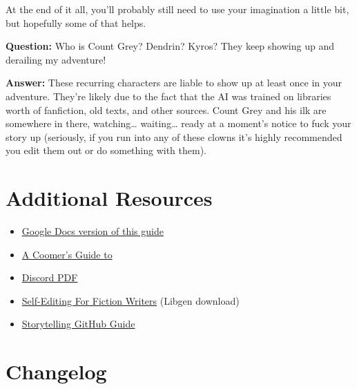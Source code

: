 \documentclass[Avsfag-main.tex]{subfiles}
\begin{document}
At the end of it all, you'll probably still need to use your imagination
a little bit, but hopefully some of that helps.\smallskip

\textbf{Question:} Who is Count Grey? Dendrin? Kyros? They keep showing
up and derailing my adventure!

\textbf{Answer:} These recurring characters are liable to show up at
least once in your adventure. They're likely due to the fact that the AI
was trained on libraries worth of fanfiction, old texts, and other
sources. Count Grey and his ilk are somewhere in there, watching…
waiting… ready at a moment's notice to fuck your story up
(seriously, if you run into any of these clowns it's highly recommended
you edit them out or do something with them).

\chapter{Additional Resources}
\label{ch:resources}

\begin{itemize}
\item
  \href{https://docs.google.com/document/d/1wSz3xlWlqMLFKrLkrO4dNWNZT1vxtrLmq2yGPJj2f4M/edit?usp=sharing}{Google Docs version of this guide}
\item
  \href{https://guide.aidg.club/A-Coomers-guide-to-AI-Dungeon/A\%20Coomer's\%20Guide\%20to\%20AI\%20Dungeon.html}{A Coomer's Guide to \aid}
\item
  \href{https://imgur.com/a/mvjk4al}{Discord PDF}
\item
  \href{https://libgen.is/book/index.php?md5=378DC2ACDDFA931EAD042ABAD32943C4}{Self-Editing
  For Fiction Writers} (Libgen download)
\item
  \href{https://github.com/FailedSave/storytelling-guide/blob/master/Guide.md}{Storytelling
  GitHub Guide}
\end{itemize}

\chapter{Changelog}
\end{document}
